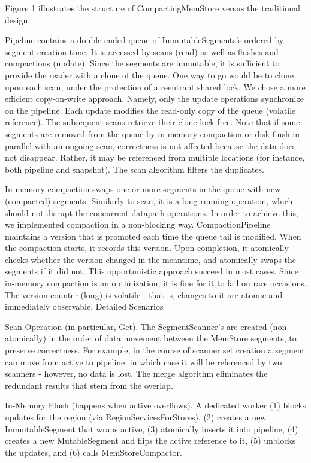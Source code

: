 Figure 1 illustrates the structure of CompactingMemStore versus the traditional design. 


Pipeline contains a double-ended queue of ImmutableSegments’s ordered by segment creation time. It is accessed by scans (read) as well as flushes and compactions (update). Since the segments are immutable, it is sufficient to provide the reader with a clone of the queue. One way to go would be to clone upon each scan, under the protection of a reentrant shared lock. We chose a more efficient copy-on-write approach. Namely, only the update operations synchronize on the pipeline. Each update modifies the read-only copy of the queue (volatile reference). The subsequent scans retrieve their clone lock-free. Note that if some segments are removed from the queue by in-memory compaction or disk flush in parallel with an ongoing scan, correctness is not affected because the data does not disappear. Rather, it may be referenced from multiple locations (for instance, both pipeline and snapshot). The scan algorithm filters the duplicates. 

In-memory compaction swaps one or more segments in the queue with new (compacted) segments. Similarly to scan, it is a long-running operation, which should not disrupt the concurrent datapath operations. In order to achieve this, we implemented compaction in a non-blocking way. CompactionPipeline maintains a version that is promoted each time the queue tail is modified. When the compaction starts, it records this version. Upon completion, it atomically checks whether the version changed in the meantime, and atomically swaps the segments if it did not. This opportunistic approach succeed in most cases. Since in-memory compaction is an optimization, it is fine for it to fail on rare occasions. The version counter (long) is volatile - that is, changes to it are atomic and immediately observable. 
Detailed Scenarios

Scan Operation (in particular, Get). The SegmentScanner’s are created (non-atomically) in the order of data movement between the MemStore segments, to preserve correctness. For example, in the course of scanner set creation a segment can move from active to pipeline, in which case it will be referenced by two scanners - however, no data is lost. The merge algorithm eliminates the redundant results that stem from the overlap.

In-Memory Flush (happens when active overflows). A dedicated worker (1) blocks updates for the region (via RegionServicesForStores), (2) creates a new ImmutableSegment that wraps active, (3) atomically inserts it into pipeline, (4) creates a new MutableSegment and flips the active reference to it, (5) unblocks the updates, and (6) calls MemStoreCompactor. 

